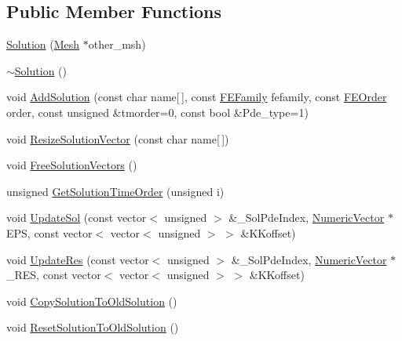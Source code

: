\subsection*{Public Member Functions}
\begin{DoxyCompactItemize}
\item 
\mbox{\hyperlink{classfemus_1_1_solution_ab033eff2b168b36efd3fac8c7c2ad1b6}{Solution}} (\mbox{\hyperlink{classfemus_1_1_mesh}{Mesh}} $\ast$other\+\_\+msh)
\item 
\mbox{\hyperlink{classfemus_1_1_solution_a477fa3a0d8d67790a0b790077c13fb1f}{$\sim$\+Solution}} ()
\item 
void \mbox{\hyperlink{classfemus_1_1_solution_a977c6a8479d58cdbff7142d687a5cedb}{Add\+Solution}} (const char name\mbox{[}$\,$\mbox{]}, const \mbox{\hyperlink{_f_elem_type_enum_8hpp_a7c9a70b7c6b5baf5d7942938d770a664}{F\+E\+Family}} fefamily, const \mbox{\hyperlink{_f_elem_type_enum_8hpp_a00ea9562f0dbb25e22bb3297d596e3ba}{F\+E\+Order}} order, const unsigned \&tmorder=0, const bool \&Pde\+\_\+type=1)
\item 
void \mbox{\hyperlink{classfemus_1_1_solution_a47520e9d8471447516b37d40f7039b77}{Resize\+Solution\+Vector}} (const char name\mbox{[}$\,$\mbox{]})
\item 
void \mbox{\hyperlink{classfemus_1_1_solution_a09bffe6359567301fe6715df0c93ff7c}{Free\+Solution\+Vectors}} ()
\item 
unsigned \mbox{\hyperlink{classfemus_1_1_solution_af76dbb0089f696728146383d073b5205}{Get\+Solution\+Time\+Order}} (unsigned i)
\item 
void \mbox{\hyperlink{classfemus_1_1_solution_aeb71bfc7bd5c675bf8f9b7c749498fa8}{Update\+Sol}} (const vector$<$ unsigned $>$ \&\+\_\+\+Sol\+Pde\+Index, \mbox{\hyperlink{classfemus_1_1_numeric_vector}{Numeric\+Vector}} $\ast$E\+PS, const vector$<$ vector$<$ unsigned $>$ $>$ \&K\+Koffset)
\item 
void \mbox{\hyperlink{classfemus_1_1_solution_aefe78476074fda27aaacc9ad7ba30582}{Update\+Res}} (const vector$<$ unsigned $>$ \&\+\_\+\+Sol\+Pde\+Index, \mbox{\hyperlink{classfemus_1_1_numeric_vector}{Numeric\+Vector}} $\ast$\+\_\+\+R\+ES, const vector$<$ vector$<$ unsigned $>$ $>$ \&K\+Koffset)
\item 
void \mbox{\hyperlink{classfemus_1_1_solution_a5f68dd8145f5ad4ac80c4eaedfea9309}{Copy\+Solution\+To\+Old\+Solution}} ()
\item 
void \mbox{\hyperlink{classfemus_1_1_solution_a2fdbb7aceee8d7986fb2954dc9e456f2}{Reset\+Solution\+To\+Old\+Solution}} ()
\item 

\end{DoxyCompactItemize}
